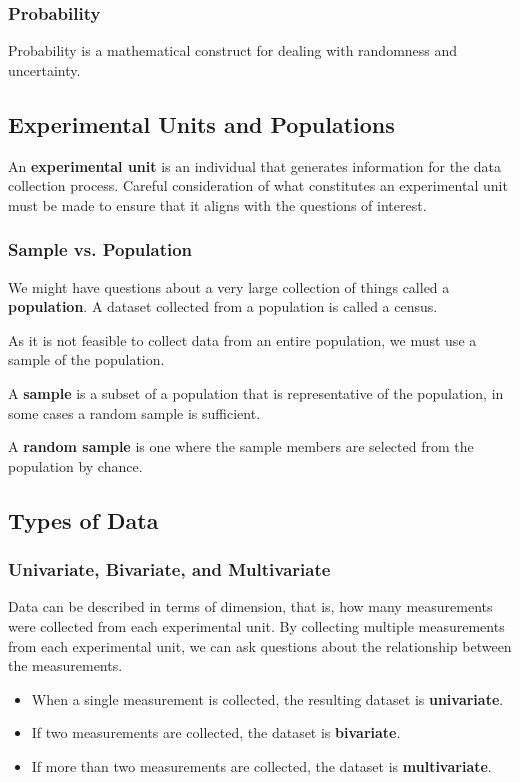 \documentclass{article}
\begin{document}
\subsubsection{Probability}
Probability is a mathematical construct for dealing with randomness and
uncertainty.
\subsection{Experimental Units and Populations}
\begin{definition}
    An \textbf{experimental unit} is an individual that generates
    information for the data collection process. Careful consideration
    of what constitutes an \linebreak experimental unit must be made to
    ensure that it aligns with the questions of interest.
\end{definition}
\subsubsection{Sample vs. Population}
\begin{definition}[Population]
    We might have questions about a very large collection of things
    called a \textbf{population}. A dataset collected from a population
    is called a census.
\end{definition}
As it is not feasible to collect data from an entire population,
we must use a sample of the population.
\begin{definition}[Sample]
    A \textbf{sample} is a subset of a population that is representative
    of the population, in some cases a random sample is sufficient.
\end{definition}
\begin{definition}
    A \textbf{random sample} is one where the sample members are
    selected from the population by chance.
\end{definition}
\subsection{Types of Data}
\subsubsection{Univariate, Bivariate, and Multivariate}
Data can be described in terms of dimension, that is, how many
measurements were collected from each experimental unit. By collecting
multiple measurements from each experimental unit, we can ask questions
about the relationship between the measurements.
\begin{itemize}
    \item When a single measurement is collected, the resulting dataset
          is \textbf{univariate}.
    \item If two measurements are collected, the dataset is
          \textbf{bivariate}.
    \item If more than two measurements are collected, the dataset is
          \textbf{multivariate}.
\end{itemize}
\end{document}
